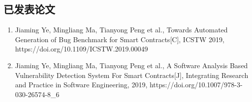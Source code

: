 
\begin{publications}

\section*{已发表论文}

\begin{enumerate}
\item Jiaming Ye, Mingliang Ma, Tianyong Peng et al., Towards Automated Generation of Bug Benchmark for Smart Contracts[C], ICSTW 2019, https://doi.org/10.1109/ICSTW.2019.00049
\item Jiaming Ye, Mingliang Ma, Tianyong Peng et al., A Software Analysis Based Vulnerability Detection System For Smart Contracts[J], Integrating Research and Practice in Software Engineering, 2019, https://doi.org/10.1007/978-3-030-26574-8\_6
\end{enumerate}

\end{publications}
